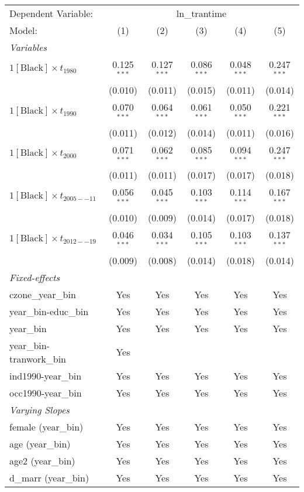 \begin{tabular}{lccccc}
\tabularnewline\midrule\midrule
Dependent Variable:&\multicolumn{5}{c}{ln\_trantime}\\
Model:&(1) & (2) & (3) & (4) & (5)\\
\midrule \emph{Variables}&   &   &   &   &  \\
$1[\text{Black}] \times t_{1980}$ & 0.125$^{***}$ & 0.127$^{***}$ & 0.086$^{***}$ & 0.048$^{***}$ & 0.247$^{***}$\\
  &(0.010) & (0.011) & (0.015) & (0.011) & (0.014)\\
$1[\text{Black}] \times t_{1990}$ & 0.070$^{***}$ & 0.064$^{***}$ & 0.061$^{***}$ & 0.050$^{***}$ & 0.221$^{***}$\\
  &(0.011) & (0.012) & (0.014) & (0.011) & (0.016)\\
$1[\text{Black}] \times t_{2000}$ & 0.071$^{***}$ & 0.062$^{***}$ & 0.085$^{***}$ & 0.094$^{***}$ & 0.247$^{***}$\\
  &(0.011) & (0.011) & (0.017) & (0.017) & (0.018)\\
$1[\text{Black}] \times t_{2005--11}$ & 0.056$^{***}$ & 0.045$^{***}$ & 0.103$^{***}$ & 0.114$^{***}$ & 0.167$^{***}$\\
  &(0.010) & (0.009) & (0.014) & (0.017) & (0.018)\\
$1[\text{Black}] \times t_{2012--19}$ & 0.046$^{***}$ & 0.034$^{***}$ & 0.105$^{***}$ & 0.103$^{***}$ & 0.137$^{***}$\\
  &(0.009) & (0.008) & (0.014) & (0.018) & (0.014)\\
\midrule \emph{Fixed-effects}&   &   &   &   &  \\
czone\_year\_bin & Yes & Yes & Yes & Yes & Yes\\
year\_bin-educ\_bin & Yes & Yes & Yes & Yes & Yes\\
year\_bin & Yes & Yes & Yes & Yes & Yes\\
year\_bin-tranwork\_bin & Yes &  &  &  & \\
ind1990-year\_bin & Yes & Yes & Yes & Yes & Yes\\
occ1990-year\_bin & Yes & Yes & Yes & Yes & Yes\\
\midrule \emph{Varying Slopes}&   &   &   &   &  \\
female (year\_bin) & Yes & Yes & Yes & Yes & Yes\\
age (year\_bin) & Yes & Yes & Yes & Yes & Yes\\
age2 (year\_bin) & Yes & Yes & Yes & Yes & Yes\\
d\_marr (year\_bin) & Yes & Yes & Yes & Yes & Yes\\

\end{tabular}
